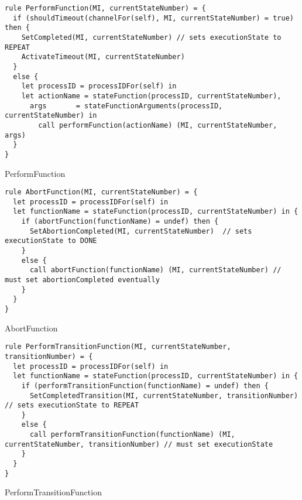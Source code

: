 \begin{listing}[H]
\begin{verbatim}
rule PerformFunction(MI, currentStateNumber) = {
  if (shouldTimeout(channelFor(self), MI, currentStateNumber) = true) then {
    SetCompleted(MI, currentStateNumber) // sets executionState to REPEAT
    ActivateTimeout(MI, currentStateNumber)
  }
  else {
    let processID = processIDFor(self) in
    let actionName = stateFunction(processID, currentStateNumber),
      args       = stateFunctionArguments(processID, currentStateNumber) in
        call performFunction(actionName) (MI, currentStateNumber, args)
  }
}
\end{verbatim}
\caption{PerformFunction}
\label{lst:asm:PerformFunction}
\end{listing}




\begin{listing}[H]
\begin{verbatim}
rule AbortFunction(MI, currentStateNumber) = {
  let processID = processIDFor(self) in
  let functionName = stateFunction(processID, currentStateNumber) in {
    if (abortFunction(functionName) = undef) then {
      SetAbortionCompleted(MI, currentStateNumber)  // sets executionState to DONE
    }
    else {
      call abortFunction(functionName) (MI, currentStateNumber) // must set abortionCompleted eventually
    }
  }
}
\end{verbatim}
\caption{AbortFunction}
\label{lst:asm:AbortFunction}
\end{listing}




\begin{listing}[H]
\begin{verbatim}
rule PerformTransitionFunction(MI, currentStateNumber, transitionNumber) = {
  let processID = processIDFor(self) in
  let functionName = stateFunction(processID, currentStateNumber) in {
    if (performTransitionFunction(functionName) = undef) then {
      SetCompletedTransition(MI, currentStateNumber, transitionNumber) // sets executionState to REPEAT
    }
    else {
      call performTransitionFunction(functionName) (MI, currentStateNumber, transitionNumber) // must set executionState
    }
  }
}
\end{verbatim}
\caption{PerformTransitionFunction}
\label{lst:asm:PerformTransitionFunction}
\end{listing}




